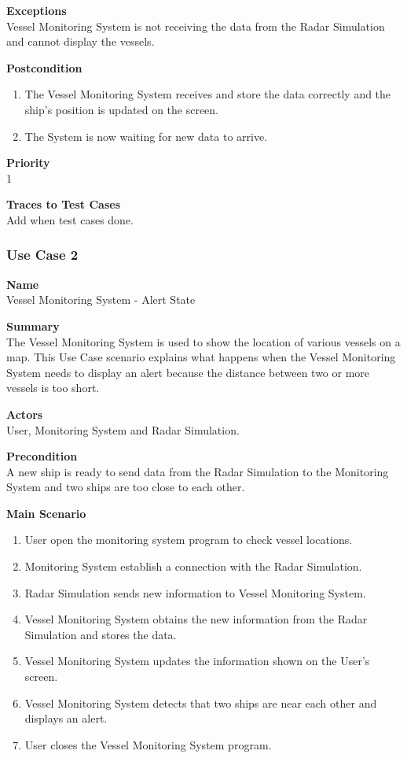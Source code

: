 \noindent
{\bf Exceptions}\\
Vessel Monitoring System is not receiving the data from the Radar Simulation and cannot display the vessels.

\noindent
{\bf Postcondition}\\
\vspace*{-0.2in}
\begin{enumerate}
\item The Vessel Monitoring System receives and store the data correctly and the ship's position is updated on the screen.
\item The System is now waiting for new data to arrive.
\end{enumerate}

\noindent
{\bf Priority}\\
1

\noindent
{\bf Traces to Test Cases}\\
Add when test cases done.

\subsubsection{Use Case 2} \label{uc:2}

\noindent
{\bf Name}\\
Vessel Monitoring System - Alert State

\noindent
{\bf Summary}\\
The Vessel Monitoring System is used to show the location of various vessels on a map. This Use Case scenario explains what happens
when the Vessel Monitoring System needs to display an alert because the distance between two or more vessels is too short.

\noindent
{\bf Actors}\\
User, Monitoring System and Radar Simulation.

\noindent
{\bf Precondition}\\
A new ship is ready to send data from the Radar Simulation to the Monitoring System and two ships are too close to each other.

\noindent
{\bf Main Scenario}\\
\vspace*{-0.2in}
\begin{enumerate}
\item User open the monitoring system program to check vessel locations.
\item Monitoring System establish a connection with the Radar Simulation.
\item Radar Simulation sends new information to Vessel Monitoring System.
\item Vessel Monitoring System obtains the new information from the Radar Simulation and stores the data.
\item Vessel Monitoring System updates the information shown on the User's screen.
\item Vessel Monitoring System detects that two ships are near each other and displays an alert.
\item User closes the Vessel Monitoring System program.
\end{enumerate}

